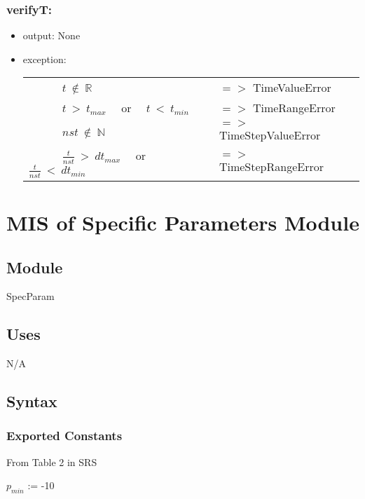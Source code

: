 \documentclass[12pt, titlepage]{article}
\begin{document}
\subsubsection*{verifyT:}
\begin{itemize}
	\item output: None
	\item exception: 
	\noindent \begin{longtable*}[l]{l l}
		\ \ \ \ \ \ $t\  \notin \  \mathbb{R}$ & $=>$ TimeValueError\\
		\ \ \ \ \ \ $ t\ >\ t_{max}$ \ \ or \ \ $t\ <\ t_{min}$ & $=>$ TimeRangeError\\
		\ \ \ \ \ \ $ nst\ \notin \  \mathbb{N}$ & $=>$ TimeStepValueError\\
		\ \ \ \ \ \ $ \frac{t}{nst}\ >\ dt_{max}$ \ \ or \ \ $\frac{t}{nst}\ <\ dt_{min}$ & $=>$ TimeStepRangeError\\
	\end{longtable*}
	
\end{itemize}

\newpage
%
%
%
%
%
\section{MIS of Specific Parameters Module} \label{SPM} 




\subsection{Module}
SpecParam

\subsection{Uses}
N/A
\subsection{Syntax}

\subsubsection{Exported Constants}

From Table 2 in SRS

$p_{min}$ := -10
\end{document}
